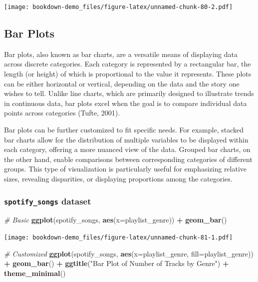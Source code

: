 \documentclass[
  b5paper]{book}
\newenvironment{Shaded}{\begin{snugshade}}{\end{snugshade}}
\newcommand{\AttributeTok}[1]{\textcolor[rgb]{0.13,0.29,0.53}{#1}}
\newcommand{\CommentTok}[1]{\textcolor[rgb]{0.56,0.35,0.01}{\textit{#1}}}
\newcommand{\FunctionTok}[1]{\textcolor[rgb]{0.13,0.29,0.53}{\textbf{#1}}}
\newcommand{\NormalTok}[1]{#1}
\newcommand{\SpecialCharTok}[1]{\textcolor[rgb]{0.81,0.36,0.00}{\textbf{#1}}}
\newcommand{\StringTok}[1]{\textcolor[rgb]{0.31,0.60,0.02}{#1}}
\begin{document}
\texttt{[image: bookdown-demo\_files/figure-latex/unnamed-chunk-80-2.pdf]}

\hypertarget{bar-plots}{%
\subsection*{Bar Plots}\label{bar-plots}}

Bar plots, also known as bar charts, are a versatile means of displaying data across discrete categories. Each category is represented by a rectangular bar, the length (or height) of which is proportional to the value it represents. These plots can be either horizontal or vertical, depending on the data and the story one wishes to tell. Unlike line charts, which are primarily designed to illustrate trends in continuous data, bar plots excel when the goal is to compare individual data points across categories (Tufte, 2001).

Bar plots can be further customized to fit specific needs. For example, stacked bar charts allow for the distribution of multiple variables to be displayed within each category, offering a more nuanced view of the data. Grouped bar charts, on the other hand, enable comparisons between corresponding categories of different groups. This type of visualization is particularly useful for emphasizing relative sizes, revealing disparities, or displaying proportions among the categories.

\hypertarget{spotify_songs-dataset-4}{%
\subsubsection*{\texorpdfstring{\texttt{spotify\_songs} dataset}{spotify\_songs dataset}}\label{spotify_songs-dataset-4}}

\begin{Shaded}
\begin{Highlighting}[]
\CommentTok{\# Basic}
\FunctionTok{ggplot}\NormalTok{(spotify\_songs, }\FunctionTok{aes}\NormalTok{(}\AttributeTok{x=}\NormalTok{playlist\_genre)) }\SpecialCharTok{+} \FunctionTok{geom\_bar}\NormalTok{()}
\end{Highlighting}
\end{Shaded}

\texttt{[image: bookdown-demo\_files/figure-latex/unnamed-chunk-81-1.pdf]}

\begin{Shaded}
\begin{Highlighting}[]
\CommentTok{\# Customized}
\FunctionTok{ggplot}\NormalTok{(spotify\_songs, }\FunctionTok{aes}\NormalTok{(}\AttributeTok{x=}\NormalTok{playlist\_genre, }\AttributeTok{fill=}\NormalTok{playlist\_genre)) }\SpecialCharTok{+}
  \FunctionTok{geom\_bar}\NormalTok{() }\SpecialCharTok{+}
  \FunctionTok{ggtitle}\NormalTok{(}\StringTok{"Bar Plot of Number of Tracks by Genre"}\NormalTok{) }\SpecialCharTok{+}
  \FunctionTok{theme\_minimal}\NormalTok{()}
\end{Highlighting}
\end{Shaded}
\end{document}
